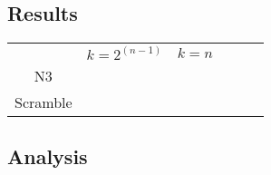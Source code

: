 \subsection{Results}
\label{Exp:Res}
\begin{table}[t]
  \begin{center}
    \begin{tabular}{c|c|c|c|c|c}\hline
               & $k=2^(n-1)$ & $k=n$ & \\
      N3       &             &       & \\
      Scramble &             &       & 
    \end{tabular}
  \end{center}
\end{table}

\subsection{Analysis}
\label{Exp:An}
